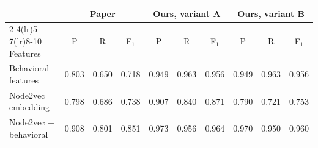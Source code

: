 \begin{tabular}{l ccc ccc ccc}
\toprule
 & \multicolumn{3}{c}{Paper} & \multicolumn{3}{c}{Ours, variant A} & \multicolumn{3}{c}{Ours, variant B}\\
\cmidrule(lr){2-4}\cmidrule(lr){5-7}\cmidrule(lr){8-10}
Features & P & R & F$_1$ & P & R & F$_1$ & P & R & F$_1$\\
\midrule
Behavioral features & 0.803 & 0.650 & 0.718 & 0.949 & 0.963 & 0.956 & 0.949 & 0.963 & 0.956\\
Node2vec embedding & 0.798 & 0.686 & 0.738 & 0.907 & 0.840 & 0.871 & 0.790 & 0.721 & 0.753\\
Node2vec + behavioral & 0.908 & 0.801 & 0.851 & 0.973 & 0.956 & 0.964 & 0.970 & 0.950 & 0.960\\
\bottomrule
\end{tabular}